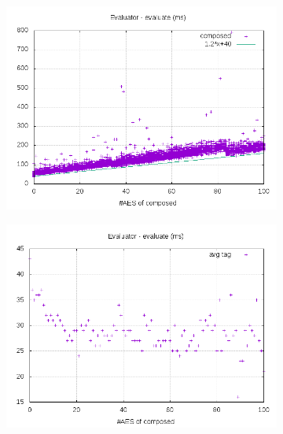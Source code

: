 \documentclass[10pt,a4paper]{article}
\begin{document}
\begin{figure}[h]
    \begin{subfigure}[t]{0.3\textwidth}
        \includegraphics[width=\textwidth]{eval_eval_plots}
        \caption{}
    \end{subfigure}
    \begin{subfigure}[t]{0.3\textwidth}
        \includegraphics[width=\textwidth]{eval_eval_avg}
        \caption{}
    \end{subfigure}
    \begin{subfigure}[t]{0.3\textwidth}

\end{subfigure}
\end{figure}
\end{document}
